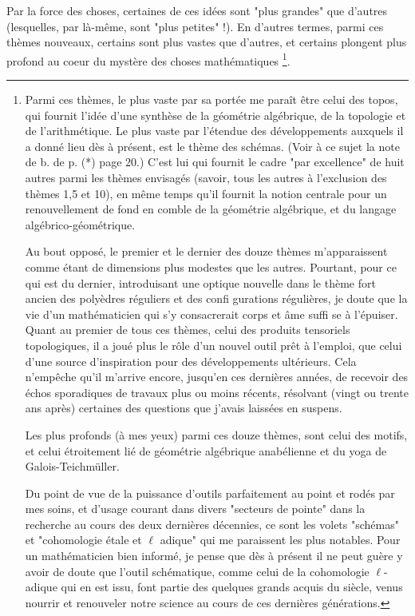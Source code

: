 Par la force des choses, certaines de ces idées sont "plus grandes" que d'autres (lesquelles, par là-même, sont "plus petites" !). En d'autres termes, parmi ces thèmes nouveaux, certains sont plus vastes que d'autres, et certains plongent plus profond au coeur du mystère des choses mathématiques \footnote{Parmi ces thèmes, le plus vaste par sa portée me paraît être celui des topos, qui fournit l'idée d'une synthèse de la géométrie algébrique, de la topologie et de l'arithmétique. Le plus vaste par l'étendue des développements auxquels il a donné lieu dès à présent, est le thème des schémas. (Voir à ce sujet la note de b. de p. (*) page 20.) C'est lui qui fournit le cadre "par excellence" de huit autres parmi les thèmes envisagés (savoir, tous les autres à l'exclusion des thèmes 1,5 et 10), en même temps qu'il fournit la notion centrale pour un renouvellement de fond en comble de la géométrie algébrique, et du langage algébrico-géométrique.

Au bout opposé, le premier et le dernier des douze thèmes m'apparaissent comme étant de dimensions plus modestes que les autres. Pourtant, pour ce qui est du dernier, introduisant une optique nouvelle dans le thème fort ancien des polyèdres réguliers et des confi gurations régulières, je doute que la vie d'un mathématicien qui s'y consacrerait corps et âme suffi se à l'épuiser. Quant au premier de tous ces thèmes, celui des produits tensoriels topologiques, il a joué plus le rôle d'un nouvel outil prêt à l'emploi, que celui d'une source d'inspiration pour des développements ultérieurs. Cela n'empêche qu'il m'arrive encore, jusqu'en ces dernières années, de recevoir des échos sporadiques de travaux plus ou moins récents, résolvant (vingt ou trente ans après) certaines des questions que j'avais laissées en suspens.

Les plus profonds (à mes yeux) parmi ces douze thèmes, sont celui des motifs, et celui étroitement lié de géométrie algébrique anabélienne et du yoga de Galois-Teichmüller.

Du point de vue de la puissance d'outils parfaitement au point et rodés par mes soins, et d'usage courant dans divers "secteurs de pointe" dans la recherche au cours des deux dernières décennies, ce sont les volets "schémas" et "cohomologie étale et $\ell$ adique" qui me paraissent les plus notables. Pour un mathématicien bien informé, je pense que dès à présent il ne peut guère y avoir de doute que l'outil schématique, comme celui de la cohomologie $\ell$-adique qui en est issu, font partie des quelques grands acquis du siècle, venus nourrir et renouveler notre science au cours de ces dernières générations.}.

